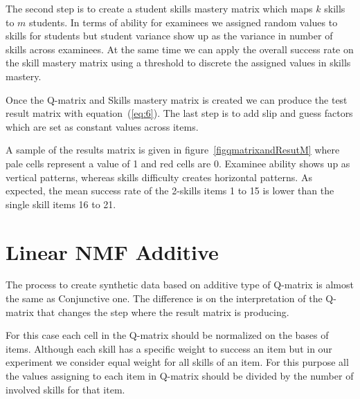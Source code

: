 The second step is to create a student skills mastery matrix which maps $k$ skills to $m$ students. In terms of ability for examinees we assigned random values to skills for students but  student variance show up as the variance in number of skills across examinees. At the same time we can apply the overall success rate on the skill mastery matrix using a threshold to discrete the assigned values in skills mastery. 

Once the Q-matrix and Skills mastery matrix is created we can produce the test result matrix with equation~(\ref{eq:6}). The last step is to add slip and guess factors which are set as constant values across items.

A sample of the results matrix is given in figure~\ref{figqmatrixandResutM} where pale cells represent a value of 1 and red cells are 0. Examinee ability shows up as vertical patterns, whereas skills difficulty creates horizontal patterns. As expected, the mean success rate of the 2-skills items 1 to 15 is lower than the single skill items 16 to 21.

\section{Linear NMF Additive}

The process to create synthetic data based on additive type of Q-matrix is almost the same as Conjunctive one. The difference is on the interpretation of the Q-matrix that changes the step where the result matrix is producing.

For this case each cell in the Q-matrix should be normalized on the bases of items. Although each skill has a specific weight to success an item but in our experiment we consider equal weight for all skills of an item. For this purpose all the values assigning to each item in Q-matrix should be divided by the number of involved skills for that item.

